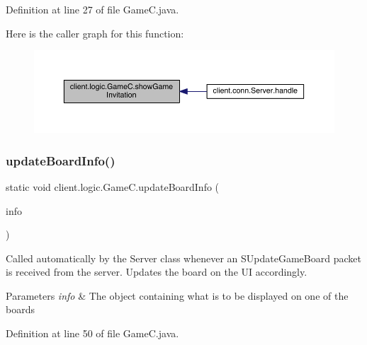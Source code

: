 Definition at line 27 of file Game\+C.\+java.

Here is the caller graph for this function\+:
\nopagebreak
\begin{figure}[H]
\begin{center}
\leavevmode
\includegraphics[width=350pt]{classclient_1_1logic_1_1_game_c_a62c530e593e489903a8ab6557763be27_icgraph}
\end{center}
\end{figure}
\hypertarget{classclient_1_1logic_1_1_game_c_a055e1c7cadc523d1c851af8856b0214d}{}\label{classclient_1_1logic_1_1_game_c_a055e1c7cadc523d1c851af8856b0214d} 
\subsubsection{\texorpdfstring{update\+Board\+Info()}{updateBoardInfo()}}
{\footnotesize\ttfamily static void client.\+logic.\+Game\+C.\+update\+Board\+Info (\begin{DoxyParamCaption}\item[{\hyperlink{classpt_1_1up_1_1fe_1_1lpro1613_1_1sharedlib_1_1structs_1_1_board_u_i_info}{Board\+U\+I\+Info}}]{info }\end{DoxyParamCaption})\hspace{0.3cm}{\ttfamily [static]}}

Called automatically by the {\ttfamily Server} class whenever an {\ttfamily S\+Update\+Game\+Board} packet is received from the server. Updates the board on the UI accordingly.


\begin{DoxyParams}{Parameters}
{\em info} & The object containing what is to be displayed on one of the boards \\
\hline
\end{DoxyParams}


Definition at line 50 of file Game\+C.\+java.

